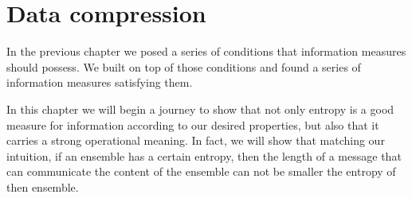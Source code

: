 \usechapterimagetrue
{} 
\chapter{Data compression}
\usechapterimagefalse
In the previous chapter we posed a series of conditions that information measures should possess. We built on top of those conditions and found a series of information measures satisfying them. 

In this chapter we will begin a journey to show that not only entropy is a good measure for information according to our desired properties, but also that it carries a strong operational meaning. In fact, we will show that matching  our intuition, if an ensemble has a certain entropy, then the length of a message that can communicate the content of the ensemble can not be smaller the entropy of then ensemble. 




